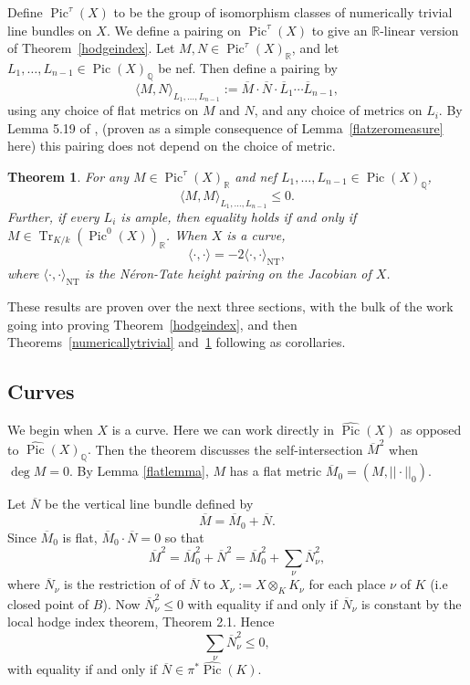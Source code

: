 \documentclass[times, doublespace]{amsart}
\numberwithin{equation}{section}
\theoremstyle{plain}
\newtheorem{theorem}[equation]{Theorem}
\theoremstyle{definition}
\DeclareMathOperator{\Pic}{Pic}
\DeclareMathOperator{\NT}{NT}
\newcommand{\Tr}{\operatorname{Tr}}
\newcommand{\imP}[1]{\Tr_{K/k}\left(\Pic^0(#1)\right)}
\newcommand{\R}{\mathbb{R}}
\newcommand{\Q}{\mathbb{Q}}
\begin{document}
Define $\Pic^{\tau}(X)$ to be the group of isomorphism classes of numerically trivial line bundles on $X$. We define a pairing on $\Pic^\tau(X)$ to give an $\R$-linear version of Theorem~\ref{hodgeindex}. Let $M,N\in\Pic^{\tau}(X)_{\R}$, and let $L_1,\dots,L_{n-1}\in\Pic(X)_{\Q}$ be nef. Then define a pairing by
\[\langle M,N\rangle_{L_1,\dots,L_{n-1}}:=\overline M\cdot\overline N\cdot\overline L_1\cdots\overline L_{n-1},\]
using any choice of flat metrics on $M$ and $N$, and any choice of metrics on $L_i$. By Lemma 5.19 of \cite{yz}, (proven as a simple consequence of Lemma~\ref{flatzeromeasure} here) this pairing does not depend on the choice of metric.

\begin{theorem}\label{rlinear}
For any $M\in\Pic^{\tau}(X)_\R$ and nef $L_1,\dots,L_{n-1}\in\Pic(X)_{\Q}$, 
\[\langle M,M\rangle_{L_1,\dots,L_{n-1}}\le0.\]
Further, if every $L_i$ is ample, then equality holds if and only if $M\in\imP{X}_{\R}$.
When $X$ is a curve, 
\[\langle\cdot,\cdot\rangle=-2\langle\cdot,\cdot\rangle_{\NT},\]
where $\langle\cdot,\cdot\rangle_{\NT}$ is the N\'eron-Tate height pairing on the Jacobian of $X$.
\end{theorem}

These results are proven over the next three sections, with the bulk of the work going into proving Theorem~\ref{hodgeindex}, and then Theorems~\ref{numericallytrivial} and~\ref{rlinear} following as corollaries. 




\subsection{Curves}

We begin when $X$ is a curve. Here we can work directly in $\widehat{\Pic}(X)$ as opposed to $\widehat{\Pic}(X)_{\Q}.$
Then the theorem discusses the self-intersection $\overline M^2$ when $\deg M=0$. By Lemma \ref{flatlemma}, $M$ has a flat metric $\overline M_0=(M,||\cdot||_0)$. 




Let $\overline N$ be the vertical line bundle defined by 
\[\overline M=\overline M_0+\overline N.\]
Since $\overline M_0$ is flat, $\overline M_0\cdot \overline N=0$ so that 
\[\overline M^2=\overline M_0^2+\overline N^2=\overline M_0^2+\sum_{\nu}\overline N^2_{\nu},\]
where $\overline N_{\nu}$ is the restriction of of $\overline N$ to $X_{\nu}:=X\otimes_KK_{\nu}$ for each place $\nu$ of $K$ (i.e closed point of $B$).
Now $\overline N_{\nu}^2\le0$ with equality if and only if $\overline N_{\nu}$ is constant by the local hodge index theorem, \cite{yz} Theorem 2.1. 
Hence 
\[\sum_{\nu}\overline N^2_{\nu}\le0,\]
with equality if and only if $\overline N\in \pi^*\widehat{\Pic}(K)$. 
\end{document}
